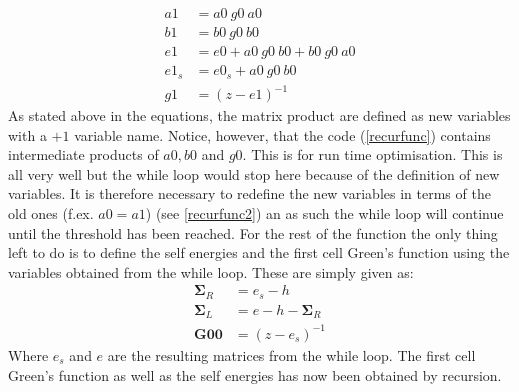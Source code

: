 \begin{align*}
a1 &= a0\ g0\ a0\\ 
b1 &= b0\ g0\ b0\\ 
e1 &= e0 + a0\ g0\ b0 + b0\ g0\ a0 \\
e1_{s} &= e0_{s} + a0\ g0\ b0 \\ 
g1 &= (z - e1)^{-1} 
\end{align*}
As stated above in the equations, the matrix product are defined as new variables with a \(+1\) variable name. Notice, however, that the code (\cref{recurfunc}) contains intermediate products of \(a0, b0\) and \(g0\). This is for run time optimisation. This is all very well but the while loop would stop here because of the definition of new variables. It is therefore necessary to redefine the new variables in terms of the old ones (f.ex. \(a0 = a1\)) (see \cref{recurfunc2}) an as such the while loop will continue until the threshold has been reached. For the rest of the function the only thing left to do is to define the self energies and the first cell Green's function using the variables obtained from the while loop. These are simply given as: 
\begin{align}\label{outputs}
    \mathbf{\Sigma}_R &= e_s - h \\ \nonumber
    \mathbf{\Sigma}_L &= e - h - \mathbf{\Sigma}_R \\ \nonumber
    \mathbf{G00} &= (z - e_s)^{-1}
\end{align}
Where \(e_s\) and \(e\) are the resulting matrices from the while loop. The first cell Green's function as well as the self energies has now been obtained by recursion. 
